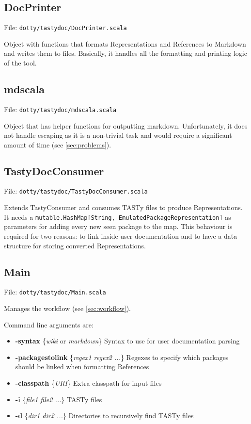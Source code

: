 \documentclass{report}
\begin{document}
\subsection{DocPrinter}
File: \texttt{dotty/tastydoc/DocPrinter.scala}

Object with functions that formats Representations and References to Markdown and writes them to files. Basically, it handles all the formatting and printing logic of the tool.

\subsection{mdscala}
File: \texttt{dotty/tastydoc/mdscala.scala}

Object that has helper functions for outputting markdown. Unfortunately, it does not handle escaping as it is a non-trivial task and would require a significant amount of time (see \autoref{sec:problems}).

\subsection{TastyDocConsumer}
File: \texttt{dotty/tastydoc/TastyDocConsumer.scala}

Extends TastyConsumer and consumes TASTy files to produce Representations. It needs a \texttt{mutable.HashMap[String, EmulatedPackageRepresentation]} as parameters for adding every new seen package to the map. This behaviour is required for two reasons: to link inside user documentation and to have a data structure for storing converted Representations.
\subsection{Main}
File: \texttt{dotty/tastydoc/Main.scala}

Manages the workflow (see \autoref{sec:workflow}).

Command line arguments are:
\begin{itemize}
    \item \textbf{-syntax} \{\textit{wiki} or \textit{markdown}\} Syntax to use for user documentation parsing
    \item \textbf{-packagestolink} \{\textit{regex1 regex2 ...}\} Regexes to specify which packages should be linked when formatting References
    \item \textbf{-classpath} \{\textit{URI}\} Extra classpath for input files
    \item \textbf{-i} \{\textit{file1 file2 ...}\} TASTy files
    \item \textbf{-d} \{\textit{dir1 dir2 ...}\} Directories to recursively find TASTy files
\end{itemize}
\end{document}
